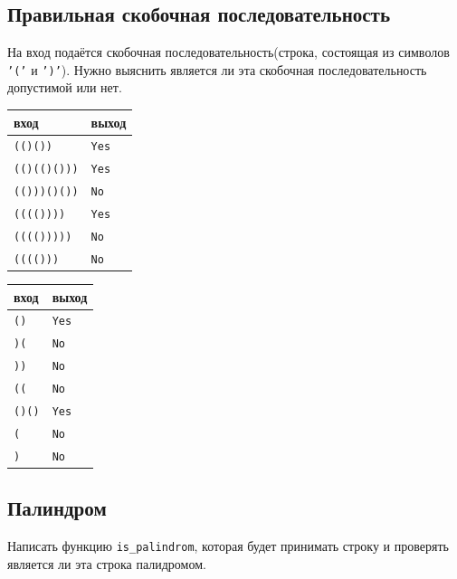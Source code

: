 \documentclass{article}
\begin{document}
\subsection{Правильная скобочная последовательность}
На вход подаётся скобочная последовательность(строка, состоящая из символов \texttt{'('} и \texttt{')'}). Нужно выяснить является ли эта скобочная последовательность допустимой или нет.
\begin{multicols}{2}
\begin{center}
\begin{tabular}{ l | l }
 вход & выход \\ \hline
 \texttt{(()())} & \texttt{Yes} \\
 \texttt{(()(()()))} & \texttt{Yes} \\
 \texttt{(()))()())} & \texttt{No} \\
 \texttt{(((())))} & \texttt{Yes} \\
 \texttt{(((()))))} & \texttt{No} \\
 \texttt{(((()))} & \texttt{No} \\
\end{tabular}
\end{center}

\begin{center}
\begin{tabular}{ l | l }
 вход & выход \\ \hline
 \texttt{()} & \texttt{Yes} \\
 \texttt{)(} & \texttt{No} \\
 \texttt{))} & \texttt{No} \\
 \texttt{((} & \texttt{No} \\
 \texttt{()()} & \texttt{Yes} \\
 \texttt{(} & \texttt{No} \\
 \texttt{)} & \texttt{No} \\
\end{tabular}
\end{center}
\end{multicols}


\subsection{Палиндром}
Написать функцию \texttt{is\_palindrom}, которая будет принимать строку и проверять является ли эта строка палидромом.
\end{document}
